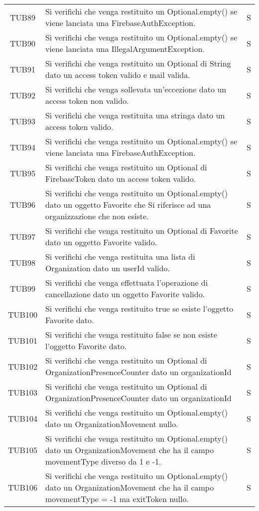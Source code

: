 {\begin{longtable}{ c C{13cm} C{1cm}}
TUB89 & Si verifichi che venga restituito un Optional.empty() se viene lanciata una FirebaseAuthException. & S \\
TUB90 & Si verifichi che venga restituito un Optional.empty() se viene lanciata una IllegalArgumentException. & S \\
TUB91 & Si verifichi che venga restituito un Optional di String dato un access token valido e mail valida. & S \\
TUB92 & Si verifichi che venga sollevata un'eccezione dato un access token non valido. & S \\
TUB93 & Si verifichi che venga restituita una stringa dato un access token valido. & S \\
TUB94 & Si verifichi che venga restituito un Optional.empty() se viene lanciata una FirebaseAuthException. & S \\
TUB95 & Si verifichi che venga restituito un Optional di FirebaseToken dato un access token valido. & S \\
TUB96 & Si verifichi che venga restituito un Optional.empty() dato un oggetto Favorite che Si riferisce ad una organizzazione che non esiste. & S \\
TUB97 & Si verifichi che venga restituito un Optional di Favorite dato un oggetto Favorite valido. & S \\
TUB98 & Si verifichi che venga restituita una lista di Organization dato un userId valido. & S \\
TUB99 & Si verifichi che venga effettuata l'operazione di cancellazione dato un oggetto Favorite valido. & S \\
TUB100 & Si verifichi che venga restituito true se esiste l'oggetto Favorite dato. & S \\
TUB101 & Si verifichi che venga restituito false se non esiste l'oggetto Favorite dato. & S \\
TUB102 & Si verifichi che venga restituito un Optional di OrganizationPresenceCounter dato un organizationId & S \\
TUB103 & Si verifichi che venga restituito un Optional di OrganizationPresenceCounter dato un organizationId & S \\
TUB104 & Si verifichi che venga restituito un Optional.empty()  dato un OrganizationMovement nullo. & S \\
TUB105 & Si verifichi che venga restituito un Optional.empty() dato un OrganizationMovement che ha il campo movementType diverso da 1 e -1. & S \\
TUB106 & Si verifichi che venga restituito un Optional.empty() dato un OrganizationMovement che ha il campo movementType = -1 ma exitToken nullo. & S \\

\end{longtable}}
